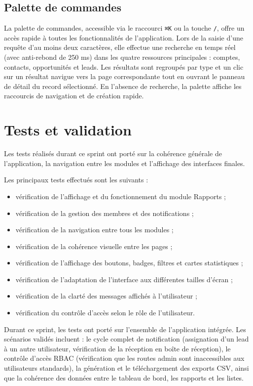 \documentclass[12pt,a4paper,twoside,openany]{book}
\begin{document}
\subsection{Palette de commandes}

La palette de commandes, accessible via le raccourci \texttt{⌘K} ou la touche \texttt{/}, offre un accès rapide à toutes les fonctionnalités de l’application. Lors de la saisie d’une requête d’au moins deux caractères, elle effectue une recherche en temps réel (avec anti-rebond de 250 ms) dans les quatre ressources principales : comptes, contacts, opportunités et leads. Les résultats sont regroupés par type et un clic sur un résultat navigue vers la page correspondante tout en ouvrant le panneau de détail du record sélectionné. En l’absence de recherche, la palette affiche les raccourcis de navigation et de création rapide.

\section{Tests et validation}

Les tests réalisés durant ce sprint ont porté sur la cohérence générale de l’application, la navigation entre les modules et l’affichage des interfaces finales.

Les principaux tests effectués sont les suivants :

\begin{itemize}
    \item vérification de l’affichage et du fonctionnement du module Rapports ;
    \item vérification de la gestion des membres et des notifications ;
    \item vérification de la navigation entre tous les modules ;
    \item vérification de la cohérence visuelle entre les pages ;
    \item vérification de l’affichage des boutons, badges, filtres et cartes statistiques ;
    \item vérification de l’adaptation de l’interface aux différentes tailles d’écran ;
    \item vérification de la clarté des messages affichés à l’utilisateur ;
    \item vérification du contrôle d’accès selon le rôle de l’utilisateur.
\end{itemize}

Durant ce sprint, les tests ont porté sur l’ensemble de l’application intégrée. Les scénarios validés incluent : le cycle complet de notification (assignation d’un lead à un autre utilisateur, vérification de la réception en boîte de réception), le contrôle d’accès RBAC (vérification que les routes admin sont inaccessibles aux utilisateurs standards), la génération et le téléchargement des exports CSV, ainsi que la cohérence des données entre le tableau de bord, les rapports et les listes.
\end{document}
